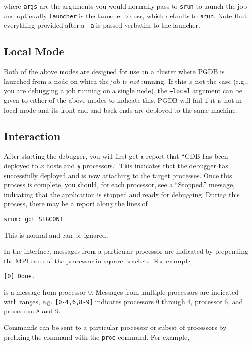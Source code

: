 \documentclass{refart}
\begin{document}
where \texttt{args} are the arguments you would normally pass to \texttt{srun} to launch the job and optionally \texttt{launcher} is the launcher to use, which defaults to \texttt{srun}. Note that everything provided after a \texttt{-a} is passed verbatim to the launcher.

\subsection{Local Mode}

Both of the above modes are designed for use on a cluster where PGDB is launched from a node on which the job is \emph{not} running. If this is not the case (e.g., you are debugging a job running on a single node), the \texttt{--local} argument can be given to either of the above modes to indicate this. PGDB will fail if it is not in local mode and its front-end and back-ends are deployed to the same machine.

\subsection{Interaction}

After starting the debugger, you will first get a report that ``GDB has been deployed to $x$ hosts and $y$ processors.'' This indicates that the debugger has successfully deployed and is now attaching to the target processes. Once this process is complete, you should, for each processor, see a ``Stopped.'' message, indicating that the application is stopped and ready for debugging. During this process, there may be a report along the lines of

\begin{Verbatim}
srun: got SIGCONT
\end{Verbatim}

This is normal and can be ignored.

In the interface, messages from a particular processor are indicated by prepending the MPI rank of the processor in square brackets. For example,

\begin{Verbatim}
[0] Done.
\end{Verbatim}

is a message from processor 0. Messages from multiple processors are indicated with ranges, e.g. \texttt{[0-4,6,8-9]} indicates processors 0 through 4, processor 6, and processors 8 and 9.

Commands can be sent to a particular processor or subset of processors by prefixing the command with the \texttt{proc} command. For example,
\end{document}
